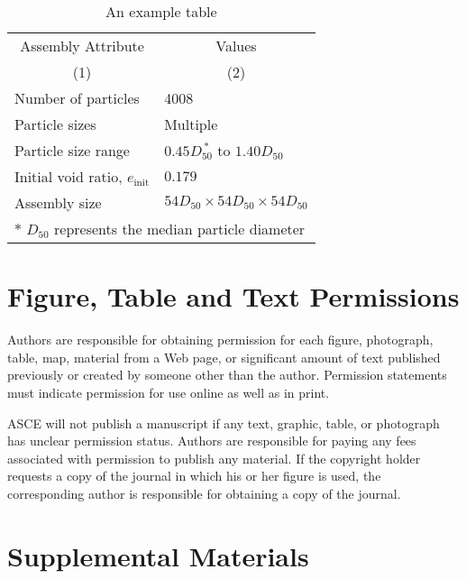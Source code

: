 \documentclass[NewProceedings,letterpaper]{ascelike-new}
\begin{document}
\begin{table}
	\caption{An example table}
	\label{table:assembly}
	\centering
	\small
	\renewcommand{\arraystretch}{1.25}
	\begin{tabular}{l l}
		\hline\hline
		\multicolumn{1}{c}{Assembly Attribute}  &
		\multicolumn{1}{c}{Values}                                                           \\
		\multicolumn{1}{c}{(1)}                 &
		\multicolumn{1}{c}{(2)}                                                              \\
		\hline
		Number of particles                     & 4008                                       \\
		Particle sizes                          & Multiple                                   \\
		Particle size range                     & $0.45D_{50}^{\:\ast}$ to $1.40D_{50}$      \\
		Initial void ratio, $e_{\mathrm{init}}$ & $0.179$                                    \\
		Assembly size                           & $54D_{50} \times 54D_{50} \times 54D_{50}$ \\
		\hline
		\multicolumn{2}{l}{$\ast$ $D_{50}$ represents the median particle diameter}          \\
		\hline\hline
	\end{tabular}
	\normalsize
\end{table}

\section{Figure, Table and Text Permissions}

Authors are responsible for obtaining permission for each figure, photograph, table, map, material from a Web page, or significant amount of text published previously or created by someone other than the author. Permission statements must indicate permission for use online as well as in print.

ASCE will not publish a manuscript if any text, graphic, table, or photograph has unclear permission status. Authors are responsible for paying any fees associated with permission to publish any material. If the copyright holder requests a copy of the journal in which his or her figure is used, the corresponding author is responsible for obtaining a copy of the journal.

\section{Supplemental Materials}
\end{document}
